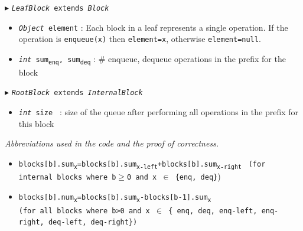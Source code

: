\documentclass[10pt]{article}
\newcommand{\sub}[1]{\textsubscript{#1}}
\renewcommand{\tt}[1]{\texttt{#1}}
\renewcommand{\sl}[1]{\textsl{#1}}
\renewcommand{\it}[1]{\textit{#1}}
\newcommand{\size}{size }
\theoremstyle{definition}
\begin{document}
\begin{algorithm}
\begin{algorithmic}[1]
\begin{multicols}{2}
\Statex $\blacktriangleright$ \tt{\sl{LeafBlock} extends \sl{Block}}
\begin{itemize}
  \item \tt{\sl{Object} element}
  \textsf{: Each block in a leaf represents a single operation. If the operation is \tt{enqueue(x)} then \tt{element=x}, otherwise \tt{element=null}.}
  
    \item \tt{\sl{int} sum\sub{enq}, sum\sub{deq}}
  \textsf{: \# enqueue, dequeue operations in the prefix for the block}
\end{itemize}

\Statex $\blacktriangleright$ \tt{\sl{RootBlock} extends \sl{InternalBlock}}
\begin{itemize}
  \item \tt{\sl{int} \size}
  \textsf{: size of the queue after performing all operations in the prefix for this block}
\end{itemize}

\end{multicols}
\end{algorithmic}
\end{algorithm}

\begin{footnotesize}

\it{Abbreviations used in the code and the proof of correctness.}
\begin{itemize}
 \item \tt{blocks[b].sum\sub{x}=blocks[b].sum\sub{x-left}+blocks[b].sum\sub{x-right}}  \tt{ (for internal blocks where b$\geq$0 and x $\in$ \{enq, deq\}})
  \item \tt{blocks[b].num\sub{x}=blocks[b].sum\sub{x}-blocks[b-1].sum\sub{x}} \\ \tt{(for all blocks where b>0 and x $\in$ \{ enq, deq, enq-left, enq-right, deq-left, deq-right\})}
\end{itemize}
\end{footnotesize}

\pagebreak
\end{document}
